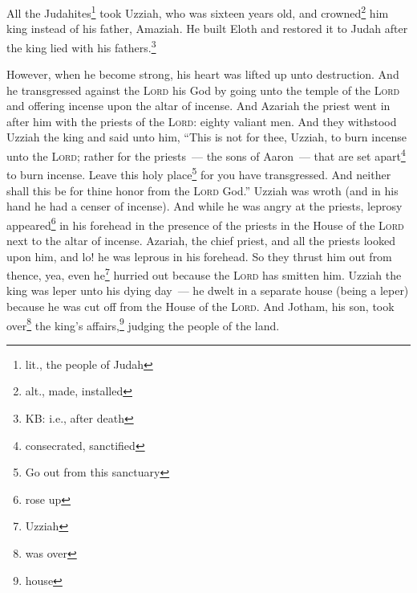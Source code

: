 
\begin{inparaenum}
     All the Judahites\footnote{lit., the people of Judah} took Uzziah, who was sixteen years old, and crowned\footnote{alt., made, installed} him king instead of his father, Amaziah.%
     He built Eloth and restored it to Judah after the king lied with his fathers.\footnote{KB: i.e., after death}%
    
    
    
     However, when he become strong, his heart was lifted up unto destruction. And he transgressed against the \textsc{Lord} his God by going unto the temple of the \textsc{Lord} and offering incense upon the altar of incense.%
     And Azariah the priest went in after him with the priests of the \textsc{Lord}: eighty valiant men.%
     And they withstood Uzziah the king and said unto him, ``This is not for thee, Uzziah, to burn incense unto the \textsc{Lord}; rather for the priests~--- the sons of Aaron~--- that are set apart\footnote{consecrated, sanctified} to burn incense. Leave this holy place\footnote{Go out from this sanctuary} for you have transgressed. And neither shall this be for thine honor from the \textsc{Lord} God.''%
     Uzziah was wroth (and in his hand he had a censer of incense). And while he was angry at the priests, leprosy appeared\footnote{rose up} in his forehead in the presence of the priests in the House of the \textsc{Lord} next to the altar of incense.%
     Azariah, the chief priest, and all the priests looked upon him, and lo! he was leprous in his forehead. So they thrust him out from thence, yea, even he\footnote{Uzziah} hurried out because the \textsc{Lord} has smitten him.%
     Uzziah the king was leper unto his dying day~--- he dwelt in a separate house (being a leper) because he was cut off from the House of the \textsc{Lord}. And Jotham, his son, took over\footnote{was over} the king's affairs,\footnote{house} judging the people of the land.%
\end{inparaenum}
